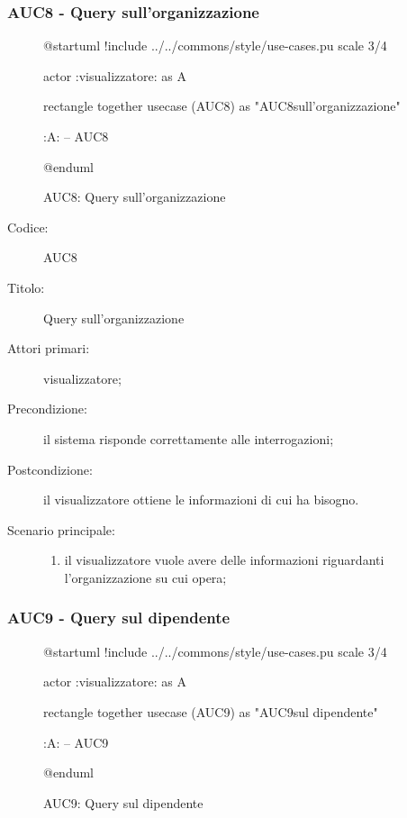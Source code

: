 \documentclass[casi-duso]{subfiles}
\begin{document}
\subsubsection{AUC8 - Query sull'organizzazione}%
\label{subsub:AUC8}

\begin{figure}[h!] 
  \centering 
  \begin{plantuml}
  @startuml
  !include ../../commons/style/use-cases.pu
  scale 3/4

  actor :visualizzatore: as A

  rectangle {
    together {
      usecase (AUC8) as "AUC8\nQuery sull'organizzazione"
    }
  }

  :A: -- AUC8

  @enduml
  \end{plantuml} 
  \caption{AUC8: Query sull'organizzazione} 
  \label{fig:auc8} 
\end{figure}

\begin{description}
  \item[Codice:] AUC8
  \item[Titolo:] Query sull'organizzazione
  \item[Attori primari:] visualizzatore;
  \item[Precondizione:] il sistema risponde correttamente alle interrogazioni;
  \item[Postcondizione:] il visualizzatore ottiene le informazioni di cui ha bisogno.
  \item[Scenario principale:]
  \begin{enumerate}
    \item il visualizzatore vuole avere delle informazioni riguardanti l'organizzazione su cui opera;
  \end{enumerate}
\end{description}

\subsubsection{AUC9 - Query sul dipendente}%
\label{subsub:AUC9}

\begin{figure}[h!] 
  \centering 
  \begin{plantuml}
  @startuml
  !include ../../commons/style/use-cases.pu
  scale 3/4

  actor :visualizzatore: as A

  rectangle {
    together {
      usecase (AUC9) as "AUC9\nQuery sul dipendente"
    }
  }

  :A: -- AUC9

  @enduml
  \end{plantuml} 
  \caption{AUC9: Query sul dipendente} 
  \label{fig:auc9} 
\end{figure}
\end{document}
